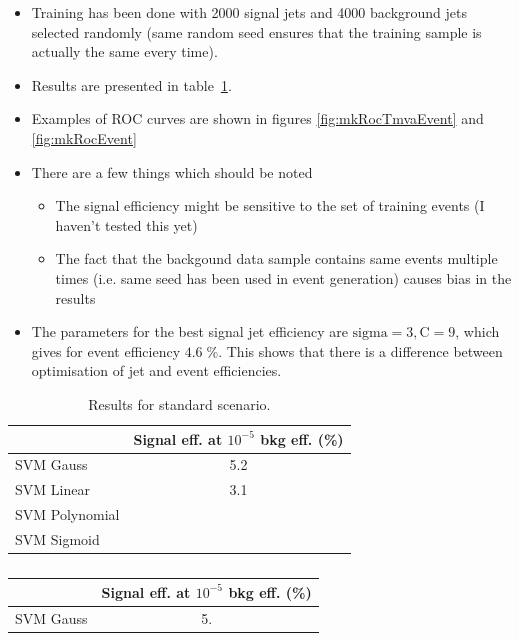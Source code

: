 \begin{itemize}
\item Training has been done with 2000 signal jets and 4000 background
  jets selected randomly (same random seed ensures that the training
  sample is actually the same every time).
\item Results are presented in table~\ref{table:results_std}.
\item Examples of ROC curves are shown in figures \ref{fig:mkRocTmvaEvent} and \ref{fig:mkRocEvent}
\item There are a few things which should be noted
  \begin{itemize}
  \item The signal efficiency might be sensitive to the set of
    training events (I haven't tested this yet)
  \item The fact that the backgound data sample contains same events
    multiple times (i.e. same seed has been used in event generation)
    causes bias in the results
  \end{itemize}

\item The parameters for the best signal jet efficiency are
  $\textrm{sigma}=3,\textrm{C}=9$, which gives for event efficiency
  $4.6\;\%$. This shows that there is a difference between
  optimisation of jet and event efficiencies.
\end{itemize}

\begin{table}[h]
  \caption{Results for standard scenario. }
  \label{table:results_std}
  \begin{center}
    \begin{tabular}{lc}
      & Signal eff. at $10^{-5}$ bkg eff. (\%) \\
      \hline
      SVM Gauss & 5.2 \\ %
      SVM Linear & 3.1 \\ %
      SVM Polynomial & \\
      SVM Sigmoid &
    \end{tabular}
  \end{center}
\end{table}

\begin{table}[h]
  \caption{}
  \label{table:results_free}
  \begin{center}
    \begin{tabular}{lc}
      & Signal eff. at $10^{-5}$ bkg eff. (\%)\\
      \hline
      SVM Gauss & 5.
    \end{tabular}
  \end{center}
\end{table}

